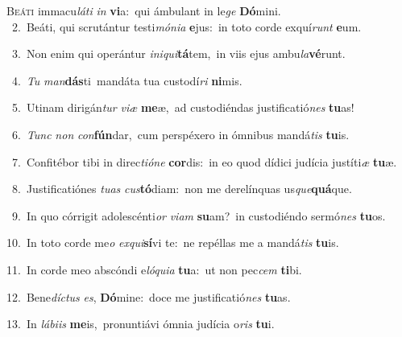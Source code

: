 \lettrine{\initial\textcolor{\initialcolor}{B}}{eáti} immacu\-\textit{lá}\-\textit{ti} \textit{in} \textbf{vi}\-a:~\star qui ámbulant in le\textit{ge} \textbf{Dó}\-mini.\\
{\numbfont\textcolor{\numbcolor}{~2.}}~Beáti, qui scrutántur testi\-\textit{mó}\-\textit{ni}\textit{a} \textbf{e}\-jus:~\star in toto corde exquí\textit{runt} \textbf{e}\-um.\par
{\numbfont\textcolor{\numbcolor}{~3.}}~Non enim qui operántur \textit{in}\-\textit{i}\textit{qui}\textbf{tá}tem,~\star in viis ejus ambu\-\textit{la}\-\textbf{vé}runt.\par
{\numbfont\textcolor{\numbcolor}{~4.}}~\textit{Tu} \textit{man}\-\textbf{dás}ti~\star mandáta tua custodí\textit{ri} \textbf{ni}\-mis.\par
{\numbfont\textcolor{\numbcolor}{~5.}}~Utinam dirigán\textit{tur} \textit{vi}\-\textit{æ} \textbf{me}\-æ,~\star ad custodiéndas justificatió\textit{nes} \textbf{tu}\-as!\par
{\numbfont\textcolor{\numbcolor}{~6.}}~\textit{Tunc} \textit{non} \textit{con}\-\textbf{fún}dar,~\star cum perspéxero in ómnibus mandá\textit{tis} \textbf{tu}\-is.\par
{\numbfont\textcolor{\numbcolor}{~7.}}~Confitébor tibi in direc\-\textit{ti}\-\textit{ó}\textit{ne} \textbf{cor}\-dis:~\star in eo quod dídici judícia justíti\textit{æ} \textbf{tu}\-æ.\par
{\numbfont\textcolor{\numbcolor}{~8.}}~Justificatiónes \textit{tu}\-\textit{as} \textit{cus}\-\textbf{tó}diam:~\star non me derelínquas us\-\textit{que}\-\textbf{quá}que.\par
{\numbfont\textcolor{\numbcolor}{~9.}}~In quo córrigit adolescénti\textit{or} \textit{vi}\-\textit{am} \textbf{su}\-am?~\star in custodiéndo sermó\textit{nes} \textbf{tu}\-os.\par
{\numbfont\textcolor{\numbcolor}{10.}}~In toto corde me\textit{o} \textit{ex}\-\textit{qui}\textbf{sí}vi te:~\star ne repéllas me a mandá\textit{tis} \textbf{tu}\-is.\par
{\numbfont\textcolor{\numbcolor}{11.}}~In corde meo abscóndi e\-\textit{ló}\-\textit{qui}\textit{a} \textbf{tu}\-a:~\star ut non pec\textit{cem} \textbf{ti}\-bi.\par
{\numbfont\textcolor{\numbcolor}{12.}}~Bene\-\textit{díc}\-\textit{tus} \textit{es}\-, \textbf{Dó}\-mine:~\star doce me justificatió\textit{nes} \textbf{tu}\-as.\par
{\numbfont\textcolor{\numbcolor}{13.}}~In \textit{lá}\-\textit{bi}\textit{is} \textbf{me}\-is,~\star pronuntiávi ómnia judícia o\textit{ris} \textbf{tu}\-i.\par
